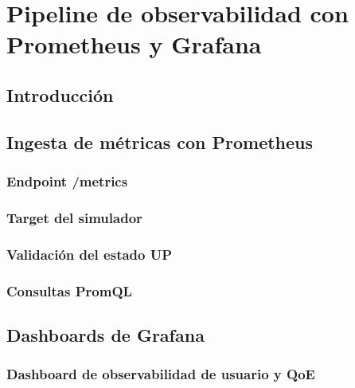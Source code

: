 %
%

\chapter{Pipeline de observabilidad con Prometheus y Grafana}
\label{cha:pipeline-observabilidad-prometheus-grafana}

\section{Introducción}
\label{sec:introduccion-pipeline-observabilidad}


\section{Ingesta de métricas con Prometheus}
\label{sec:ingesta-metricas-prometheus}

\subsection{Endpoint /metrics}
\label{subsec:endpoint-metrics}

\subsection{Target del simulador}
\label{subsec:target-simulador}

\subsection{Validación del estado UP}
\label{subsec:validacion-estado-up}

\subsection{Consultas PromQL}
\label{subsec:consultas-promql-pipeline}


\section{Dashboards de Grafana}
\label{sec:dashboards-grafana}

\subsection{Dashboard de observabilidad de usuario y QoE}
\label{subsec:dashboard-observabilidad-usuario-qoe}

